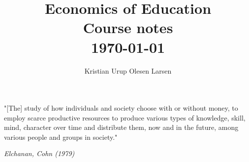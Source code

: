 \documentclass[12pt, a4paper]{article}
\begin{document}



\title{ Economics of Education  \\ \Large Course notes \\ \normalsize \today \\ 
} 
\author{\normalsize Kristian Urup Olesen Larsen}
\date{} %
\maketitle %
\setcounter{page}{1} %



\epigraph{"[The] study of how individuals and society choose
with or without money,
to employ scarce productive resources
to produce various types of knowledge, skill, mind, character
over time
and distribute them, now and in the future,
among various people and groups in society."}{\textit{Elchanan, Cohn (1979)}}
\tableofcontents
\pagebreak
\end{document}
